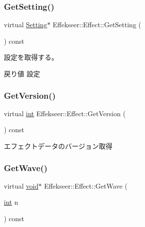 \subsubsection{\texorpdfstring{Get\+Setting()}{GetSetting()}}
{\footnotesize\ttfamily virtual \mbox{\hyperlink{class_effekseer_1_1_setting}{Setting}}$\ast$ Effekseer\+::\+Effect\+::\+Get\+Setting (\begin{DoxyParamCaption}{ }\end{DoxyParamCaption}) const\hspace{0.3cm}{\ttfamily [pure virtual]}}



設定を取得する。 

\begin{DoxyReturn}{戻り値}
設定 
\end{DoxyReturn}
\mbox{\label{class_effekseer_1_1_effect_a7dd2d6dd333e2d0cc3edcfea493017db}} 
\subsubsection{\texorpdfstring{Get\+Version()}{GetVersion()}}
{\footnotesize\ttfamily virtual \mbox{\hyperlink{namespace_effekseer_ace0abf7c2e6947e519ebe8b54cbcc30a}{int}} Effekseer\+::\+Effect\+::\+Get\+Version (\begin{DoxyParamCaption}{ }\end{DoxyParamCaption}) const\hspace{0.3cm}{\ttfamily [pure virtual]}}



エフェクトデータのバージョン取得 

\mbox{\label{class_effekseer_1_1_effect_a0ae3955ea4f21616c890c5ed2d411eea}} 
\subsubsection{\texorpdfstring{Get\+Wave()}{GetWave()}}
{\footnotesize\ttfamily virtual \mbox{\hyperlink{namespace_effekseer_ab34c4088e512200cf4c2716f168deb56}{void}}$\ast$ Effekseer\+::\+Effect\+::\+Get\+Wave (\begin{DoxyParamCaption}\item[{\mbox{\hyperlink{namespace_effekseer_ace0abf7c2e6947e519ebe8b54cbcc30a}{int}}}]{n }\end{DoxyParamCaption}) const\hspace{0.3cm}{\ttfamily [pure virtual]}}



